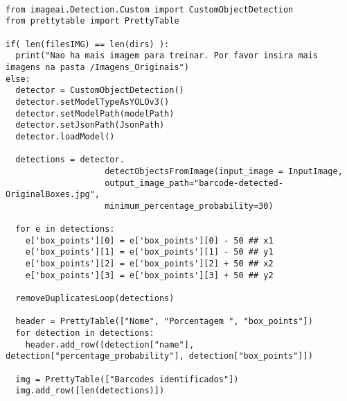 \newpage
\begin{lstlisting}[caption=Aumento da \textit{bouding box} e recorte dos \textit{barcodes} em imagens individuais, label=ap:AumentaBbox]

from imageai.Detection.Custom import CustomObjectDetection
from prettytable import PrettyTable

if( len(filesIMG) == len(dirs) ):
  print("Nao ha mais imagem para treinar. Por favor insira mais imagens na pasta /Imagens_Originais")
else:
  detector = CustomObjectDetection()
  detector.setModelTypeAsYOLOv3()
  detector.setModelPath(modelPath)
  detector.setJsonPath(JsonPath)
  detector.loadModel()

  detections = detector.
                    detectObjectsFromImage(input_image = InputImage, 
                    output_image_path="barcode-detected-OriginalBoxes.jpg",
                    minimum_percentage_probability=30)
                    
  for e in detections:
    e['box_points'][0] = e['box_points'][0] - 50 ## x1
    e['box_points'][1] = e['box_points'][1] - 50 ## y1
    e['box_points'][2] = e['box_points'][2] + 50 ## x2
    e['box_points'][3] = e['box_points'][3] + 50 ## y2

  removeDuplicatesLoop(detections)

  header = PrettyTable(["Nome", "Porcentagem ", "box_points"])
  for detection in detections:
    header.add_row([detection["name"], detection["percentage_probability"], detection["box_points"]])

  img = PrettyTable(["Barcodes identificados"])
  img.add_row([len(detections)])
\end{lstlisting}

\newpage

